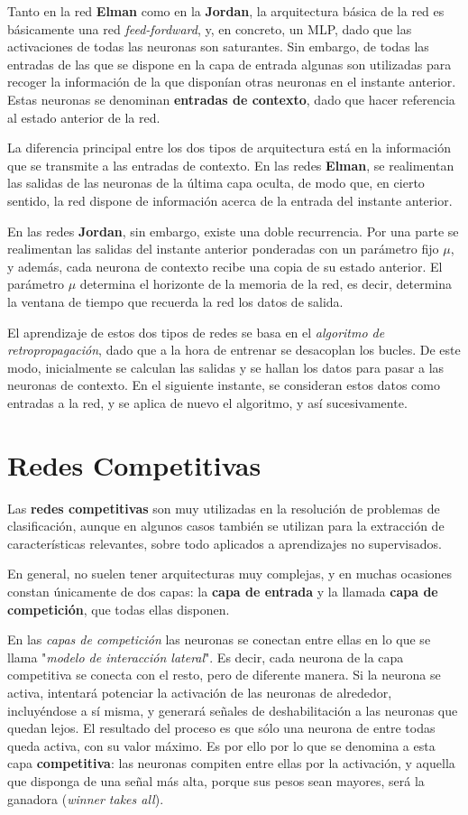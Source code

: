 \documentclass[10pt,a4paper]{article}
\begin{document}
Tanto en la red \textbf{Elman} como en la \textbf{Jordan}, la arquitectura básica de la red es básicamente una red \textit{feed-fordward}, y, en concreto, un MLP, dado que las activaciones de todas las neuronas son saturantes. Sin embargo, de todas las entradas de las que se dispone en la capa de entrada algunas son utilizadas para recoger la información de la que disponían otras neuronas en el instante anterior. Estas neuronas se denominan \textbf{entradas de contexto}, dado que hacer referencia al estado anterior de la red.

La diferencia principal entre los dos tipos de arquitectura está en la información que se transmite a las entradas de contexto. En las redes \textbf{Elman}, se realimentan las salidas de las neuronas de la última capa oculta, de modo que, en cierto sentido, la red dispone de información acerca de la entrada del instante anterior.

En las redes \textbf{Jordan}, sin embargo, existe una doble recurrencia. Por una parte se realimentan las salidas del instante anterior ponderadas con un parámetro fijo $\mu$, y además, cada neurona de contexto recibe una copia de su estado anterior. El parámetro $\mu$ determina el horizonte de la memoria de la red, es decir, determina la ventana de tiempo que recuerda la red los datos de salida.

El aprendizaje de estos dos tipos de redes se basa en el \textit{algoritmo de retropropagación}, dado que a la hora de entrenar se desacoplan los bucles. De este modo, inicialmente se calculan las salidas y se hallan los datos para pasar a las neuronas de contexto. En el siguiente instante, se consideran estos datos como entradas a la red, y se aplica de nuevo el algoritmo, y así sucesivamente.

\section{Redes Competitivas}

Las \textbf{redes competitivas} son muy utilizadas en la resolución de problemas de clasificación, aunque en algunos casos también se utilizan para la extracción de características relevantes, sobre todo aplicados a aprendizajes no supervisados.

En general, no suelen tener arquitecturas muy complejas, y en muchas ocasiones constan únicamente de dos capas: la \textbf{capa de entrada} y la llamada \textbf{capa de competición}, que todas ellas disponen.

En las \textit{capas de competición} las neuronas se conectan entre ellas en lo que se llama "\textit{modelo de interacción lateral}". Es decir, cada neurona de la capa competitiva se conecta con el resto, pero de diferente manera. Si la neurona se activa, intentará potenciar la activación de las neuronas de alrededor, incluyéndose a sí misma, y generará señales de deshabilitación a las neuronas que quedan lejos. El resultado del proceso es que sólo una neurona de entre todas queda activa, con su valor máximo. Es por ello por lo que se denomina a esta capa \textbf{competitiva}: las neuronas compiten entre ellas por la activación, y aquella que disponga de una señal más alta, porque sus pesos sean mayores, será la ganadora (\textit{winner takes all}).
\end{document}
